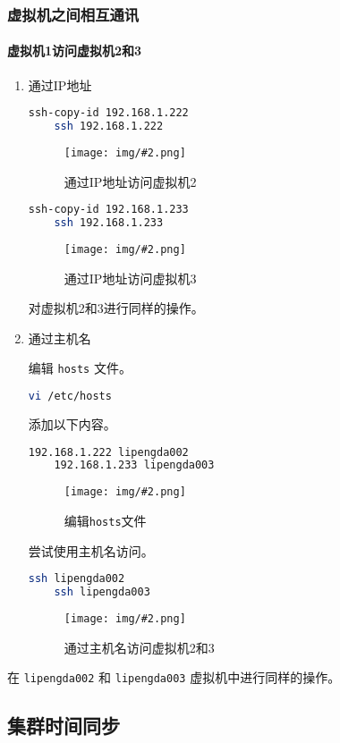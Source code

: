 \documentclass{article}
\newenvironment{enum}{
    \begin{enumerate}[label=(\arabic*), noitemsep]
}{
    \end{enumerate}
}
\newcommand{\img}[3][0.9]{%
    \begin{figure}[H]
        \centering
        \texttt{[image: img/\#2.png]}
        \caption{#3}
    \end{figure}
}
\newcommand{\subsubsubsection}[1]{\paragraph{#1}\mbox{}}
\begin{document}
\subsubsection{虚拟机之间相互通讯}

\subsubsubsection{虚拟机1访问虚拟机2和3}

\begin{enum}
    \item 通过IP地址
    
    \begin{lstlisting}[language=bash]
    ssh-copy-id 192.168.1.222
    ssh 192.168.1.222
    \end{lstlisting}

    \img[0.8]{5.3.1.1}{通过IP地址访问虚拟机2}

    \begin{lstlisting}[language=bash]
    ssh-copy-id 192.168.1.233
    ssh 192.168.1.233
    \end{lstlisting}

    \img[0.8]{5.3.1.2}{通过IP地址访问虚拟机3}

    对虚拟机2和3进行同样的操作。

    \item 通过主机名
    
    编辑 \texttt{hosts} 文件。

    \begin{lstlisting}[language=bash]
    vi /etc/hosts
    \end{lstlisting}

    添加以下内容。

    \begin{lstlisting}[language=bash]
    192.168.1.222 lipengda002
    192.168.1.233 lipengda003
    \end{lstlisting}

    \img[0.8]{5.3.1.3}{编辑\texttt{hosts}文件}

    尝试使用主机名访问。

    \begin{lstlisting}[language=bash]
    ssh lipengda002
    ssh lipengda003
    \end{lstlisting}

    \img[0.8]{5.3.1.4}{通过主机名访问虚拟机2和3}
\end{enum}

在 \texttt{lipengda002} 和 \texttt{lipengda003} 虚拟机中进行同样的操作。

\subsection{集群时间同步}
\end{document}
